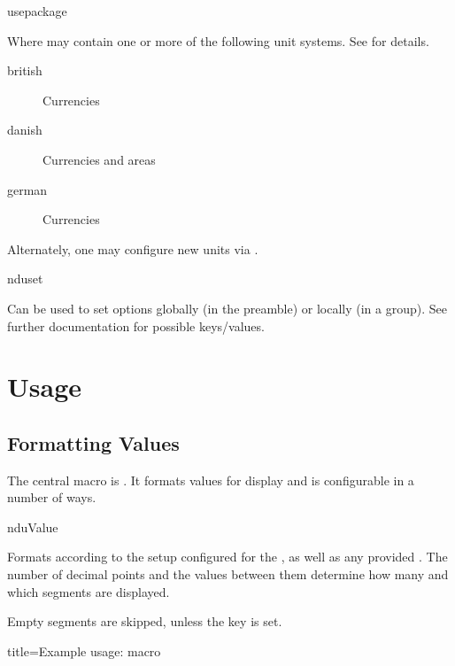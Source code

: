 \documentclass{article}
\begin{document}
\begin{docCommand}
	{usepackage}
	{}

Where  may contain one or more of the following unit systems. See  for details.

\begin{description}
\item[british] Currencies
\item[danish] Currencies and areas
\item[german] Currencies
\end{description}

Alternately, one may configure new units via .

\end{docCommand}

\begin{docCommand}
	{nduset}
	{}

	Can be used to set options globally (in the preamble) or locally (in a group). See further documentation for possible keys/values.

\end{docCommand}

\clearpage
\section{Usage} %

\subsection{Formatting Values} %

The central macro is . It formats values for display and is configurable in a number of ways.

\begin{docCommand}
	{nduValue}
	{}

Formats  according to the setup configured for the , as well as any provided . The number of decimal points and the values between them determine how many and which segments are displayed.

Empty segments are skipped, unless the  key is set.
	
\begin{dispExample*}{
	title=Example usage:  macro
}
\\
\\
\\
\\
\end{dispExample*}
\end{docCommand}
\end{document}
